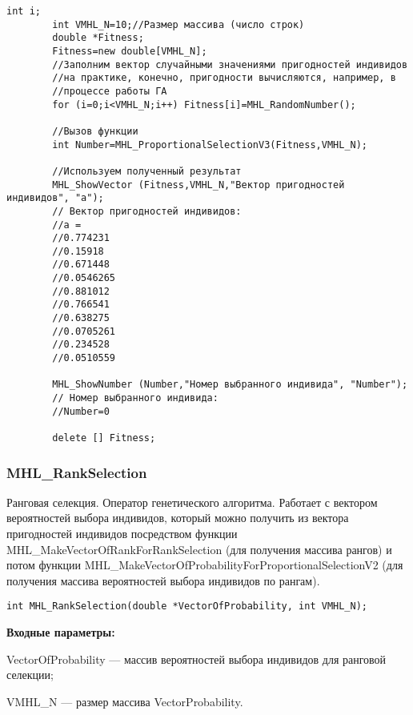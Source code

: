 \documentclass[a4paper,12pt]{article}
\begin{document}
\begin{lstlisting}[label=code_use_MHL_ProportionalSelectionV3,caption=Пример использования]
        int i;
        int VMHL_N=10;//Размер массива (число строк)
        double *Fitness;
        Fitness=new double[VMHL_N];
        //Заполним вектор случайными значениями пригодностей индивидов
        //на практике, конечно, пригодности вычисляются, например, в
        //процессе работы ГА
        for (i=0;i<VMHL_N;i++) Fitness[i]=MHL_RandomNumber();

        //Вызов функции
        int Number=MHL_ProportionalSelectionV3(Fitness,VMHL_N);

        //Используем полученный результат
        MHL_ShowVector (Fitness,VMHL_N,"Вектор пригодностей индивидов", "a");
        // Вектор пригодностей индивидов:
        //a =	
        //0.774231
        //0.15918
        //0.671448
        //0.0546265
        //0.881012
        //0.766541
        //0.638275
        //0.0705261
        //0.234528
        //0.0510559

        MHL_ShowNumber (Number,"Номер выбранного индивида", "Number");
        // Номер выбранного индивида:
        //Number=0
        
        delete [] Fitness;
\end{lstlisting}

\subsubsection{MHL\_RankSelection}\label{MHL_RankSelection}

Ранговая селекция. Оператор генетического алгоритма. Работает с вектором вероятностей выбора индивидов, который можно получить из вектора пригодностей индивидов посредством функции MHL\_MakeVectorOfRankForRankSelection (для получения массива рангов) и потом функции MHL\_MakeVectorOfProbabilityForProportionalSelectionV2 (для получения массива вероятностей выбора индивидов по рангам).


\begin{lstlisting}[label=code_syntax_MHL_RankSelection,caption=Синтаксис]
int MHL_RankSelection(double *VectorOfProbability, int VMHL_N);
\end{lstlisting}

\textbf{Входные параметры:}
 
 VectorOfProbability --- массив вероятностей выбора индивидов для ранговой селекции;
 
 VMHL\_N --- размер массива VectorProbability.
\end{document}
